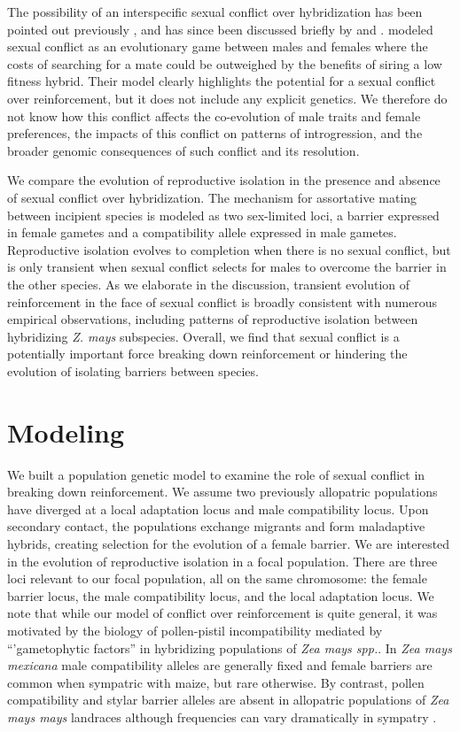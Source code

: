 \documentclass[11pt]{article}
\begin{document}
The possibility of an interspecific sexual conflict over hybridization has been pointed out previously \citet{parker1998}, and has since been discussed briefly by \citet{gavrilets2005} and \citet{coyneandorrbook}.  
\citep{parker1998} modeled sexual conflict as an evolutionary game between males and females where the costs of searching for a mate could be outweighed by the benefits of siring a low fitness hybrid. 
Their model clearly highlights the potential for a sexual conflict over reinforcement, but it does not include any explicit genetics.  We therefore do not know how this conflict affects the co-evolution of male traits and female preferences, the impacts of this conflict on patterns of introgression, and the broader genomic consequences of such conflict and its resolution. 

We compare the evolution of reproductive isolation in the presence and absence of sexual conflict over hybridization. 
The mechanism for assortative mating between incipient species is modeled as two sex-limited loci, a barrier expressed in female gametes and a compatibility allele expressed in male gametes.  
Reproductive isolation evolves to completion when there is no sexual conflict, but is only transient  when sexual conflict selects for males to overcome the barrier in the other species.  
As we elaborate in the discussion, transient evolution of reinforcement in the face of sexual conflict is broadly consistent with numerous empirical observations, including patterns of reproductive isolation between hybridizing \textit{Z. mays} subspecies.  
Overall, we find that sexual conflict is a potentially important force breaking down reinforcement or hindering the evolution of isolating barriers between species. 






\section*{Modeling}

We built a population genetic model to examine the role of sexual conflict in breaking down reinforcement. We assume two previously allopatric populations have diverged at a local adaptation locus and male compatibility locus. Upon secondary contact, the populations exchange migrants and form maladaptive hybrids, creating selection for the evolution of a female barrier. We are interested in the evolution of reproductive isolation in a focal population. There are three loci relevant to our focal population, all on the same chromosome: the female barrier locus, the male compatibility locus, and the local adaptation locus. We note that while our model of conflict over reinforcement is quite general, it was motivated by the biology of pollen-pistil incompatibility mediated by ``'gametophytic factors'' in hybridizing populations of \textit{Zea mays spp.}. In  \textit{Zea mays mexicana} male compatibility alleles are generally fixed and female barriers are common when sympatric with maize, but rare otherwise. By contrast, pollen compatibility and stylar barrier alleles are absent in allopatric populations of \textit{Zea mays mays} landraces although frequencies can vary dramatically in sympatry  \citep[see e.g. ][]{kermicle2006}. 
\end{document}
